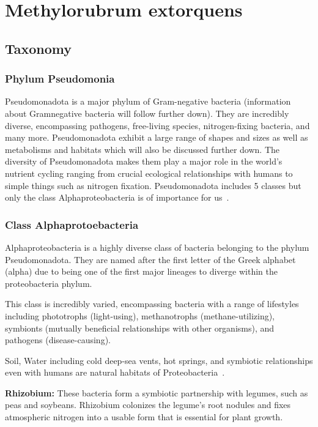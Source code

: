 \chapter{Methylorubrum extorquens\authorB{}}

\section{{Taxonomy}}

\subsection{Phylum Pseudomonia}
Pseudomonadota is a major phylum of Gram-negative bacteria (information about Gramnegative bacteria will follow further down). They are incredibly diverse, encompassing
pathogens, free-living species, nitrogen-fixing bacteria, and many more.
Pseudomonadota exhibit a large range of shapes and sizes as well as metabolisms and
habitats which will also be discussed further down. The diversity of Pseudomonadota
makes them play a major role in the world's nutrient cycling ranging from crucial
ecological relationships with humans to simple things such as nitrogen fixation.
Pseudomonadota includes 5 classes but only the class Alphaproteobacteria is of
importance for us~\cite{pseudomonadota}.

\subsection{Class Alphaprotoebacteria}
Alphaproteobacteria is a highly diverse class of bacteria belonging to the phylum
Pseudomonadota.
They are named after the first letter of the Greek alphabet (alpha) due
to being one of the first major lineages to diverge within the proteobacteria phylum.

This class is incredibly varied, encompassing bacteria with a range of lifestyles including
phototrophs (light-using), methanotrophs (methane-utilizing), symbionts (mutually
beneficial relationships with other organisms), and pathogens (disease-causing).

Soil, Water including cold deep-sea vents, hot springs, and symbiotic relationships even
with humans are natural habitats of Proteobacteria~\cite{gammaproteobacteria}.

\textbf{Rhizobium:} These bacteria form a symbiotic partnership with legumes, such as peas and
soybeans.
Rhizobium colonizes the legume's root nodules and fixes atmospheric nitrogen
into a usable form that is essential for plant growth.

